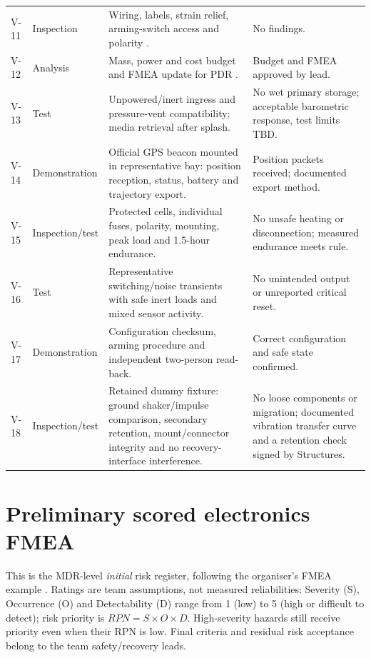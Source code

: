 \begin{longtable}{@{}L{11mm}L{23mm}L{70mm}L{42mm}@{}}
V-11 & Inspection & Wiring, labels, strain relief, arming-switch access and polarity \cite{rtc2027app03}. & No findings.\\
V-12 & Analysis & Mass, power and cost budget and FMEA update for PDR \cite{rtc2027app12}. & Budget and FMEA approved by lead.\\
V-13 & Test & Unpowered/inert ingress and pressure-vent compatibility; media retrieval after splash. & No wet primary storage; acceptable barometric response, test limits TBD.\\
V-14 & Demonstration & Official GPS beacon mounted in representative bay: position reception, status, battery and trajectory export. & Position packets received; documented export method.\\
V-15 & Inspection/test & Protected cells, individual fuses, polarity, mounting, peak load and 1.5-hour endurance. & No unsafe heating or disconnection; measured endurance meets rule.\\
V-16 & Test & Representative switching/noise transients with safe inert loads and mixed sensor activity. & No unintended output or unreported critical reset.\\
V-17 & Demonstration & Configuration checksum, arming procedure and independent two-person read-back. & Correct configuration and safe state confirmed.\\
V-18 & Inspection/test & Retained dummy fixture: ground shaker/impulse comparison, secondary retention, mount/connector integrity and no recovery-interface interference. & No loose components or migration; documented vibration transfer curve and a retention check signed by Structures.\\
\end{longtable}
\endgroup %
\normalsize


\section{Preliminary scored electronics FMEA}
\label{sec:fmea}
This is the MDR-level \emph{initial} risk register, following the organiser's FMEA example \cite{rtc2027app12}. Ratings are team assumptions, not measured reliabilities: Severity (S), Occurrence (O) and Detectability (D) range from 1 (low) to 5 (high or difficult to detect); risk priority is $RPN=S\times O\times D$. High-severity hazards still receive priority even when their RPN is low. Final criteria and residual risk acceptance belong to the team safety/recovery leads.


